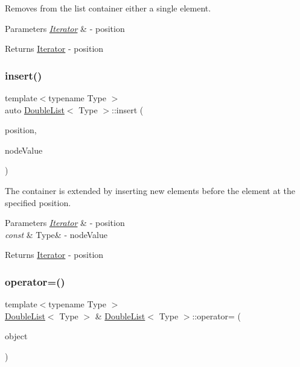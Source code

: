 Removes from the list container either a single element. 


\begin{DoxyParams}{Parameters}
{\em \hyperlink{classDoubleList_1_1Iterator}{Iterator}} & -\/ position \\
\hline
\end{DoxyParams}
\begin{DoxyReturn}{Returns}
\hyperlink{classDoubleList_1_1Iterator}{Iterator} -\/ position 
\end{DoxyReturn}
\mbox{\label{classDoubleList_a4fd49f28ae07fd52f6932f21d8604041}} 
\subsubsection{\texorpdfstring{insert()}{insert()}}
{\footnotesize\ttfamily template$<$typename Type $>$ \\
auto \hyperlink{classDoubleList}{Double\+List}$<$ Type $>$\+::insert (\begin{DoxyParamCaption}\item[{\hyperlink{classDoubleList_1_1Iterator}{Iterator}}]{position,  }\item[{const Type \&}]{node\+Value }\end{DoxyParamCaption})}



The container is extended by inserting new elements before the element at the specified position. 


\begin{DoxyParams}{Parameters}
{\em \hyperlink{classDoubleList_1_1Iterator}{Iterator}} & -\/ position \\
\hline
{\em const} & Type\& -\/ node\+Value \\
\hline
\end{DoxyParams}
\begin{DoxyReturn}{Returns}
\hyperlink{classDoubleList_1_1Iterator}{Iterator} -\/ position 
\end{DoxyReturn}
\mbox{\label{classDoubleList_a40f09405df1e632df1d868caa20b5c4e}} 
\subsubsection{\texorpdfstring{operator=()}{operator=()}}
{\footnotesize\ttfamily template$<$typename Type $>$ \\
\hyperlink{classDoubleList}{Double\+List}$<$ Type $>$ \& \hyperlink{classDoubleList}{Double\+List}$<$ Type $>$\+::operator= (\begin{DoxyParamCaption}\item[{const \hyperlink{classDoubleList}{Double\+List}$<$ Type $>$ \&}]{object }\end{DoxyParamCaption})}




